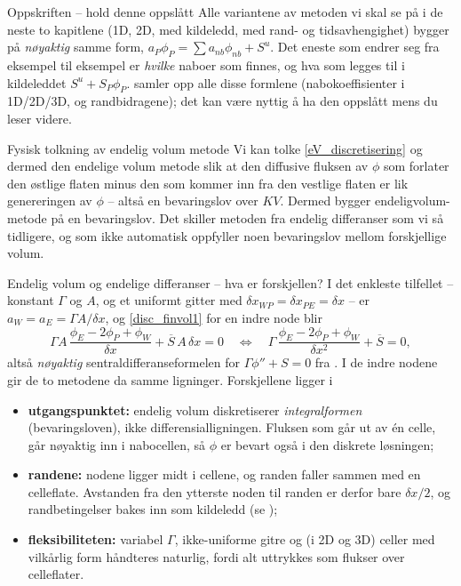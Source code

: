 \begin{rem}{Oppskriften -- hold denne oppslått}
Alle variantene av metoden vi skal se på i de neste to kapitlene (1D, 2D, med kildeledd, med rand- og tidsavhengighet) bygger på \emph{nøyaktig} samme form, $a_P\phi_P=\sum a_{nb}\phi_{nb}+S^u$. Det eneste som endrer seg fra eksempel til eksempel er \emph{hvilke} naboer som finnes, og hva som legges til i kildeleddet $S^u+S_P\phi_P$.  samler opp alle disse formlene (nabokoeffisienter i 1D/2D/3D, og randbidragene); det kan være nyttig å ha den oppslått mens du leser videre.
\end{rem}

\begin{oppsum}{Fysisk tolkning av endelig volum metode}
Vi kan tolke \eqref{eV_discretisering} og dermed den endelige volum metode slik at den diffusive fluksen av $\phi$ som forlater den østlige flaten minus den som kommer inn fra den vestlige flaten er lik genereringen av $\phi$ – altså en bevaringslov over $KV$.
Dermed bygger endeligvolum-metode på en bevaringslov. Det skiller metoden fra endelig differanser som vi så tidligere, og som ikke automatisk oppfyller noen bevaringslov mellom forskjellige volum.
\end{oppsum}

\begin{rem}{Endelig volum og endelige differanser -- hva er forskjellen?}\label{rem:EVM_FD}
I det enkleste tilfellet -- konstant $\Gamma$ og $A$, og et uniformt gitter med $\delta x_{WP}=\delta x_{PE}=\delta x$ -- er $a_W=a_E=\Gamma A/\delta x$, og \eqref{disc_finvol1} for en indre node blir
\[
\Gamma A\,\frac{\phi_E-2\phi_P+\phi_W}{\delta x} + \overline{S}\,A\,\delta x = 0
\quad\Longleftrightarrow\quad
\Gamma\,\frac{\phi_E-2\phi_P+\phi_W}{\delta x^2} + \overline{S} = 0,
\]
altså \emph{nøyaktig} sentraldifferanseformelen for $\Gamma\phi''+S=0$ fra . I de indre nodene gir de to metodene da samme ligninger. Forskjellene ligger i
\begin{itemize}
\item \textbf{utgangspunktet:} endelig volum diskretiserer \emph{integralformen} (bevaringsloven), ikke differensialligningen. Fluksen som går ut av én celle, går nøyaktig inn i nabocellen, så $\phi$ er bevart også i den diskrete løsningen;
\item \textbf{randene:} nodene ligger midt i cellene, og randen faller sammen med en celleflate. Avstanden fra den ytterste noden til randen er derfor bare $\delta x/2$, og randbetingelser bakes inn som kildeledd (se );
\item \textbf{fleksibiliteten:} variabel $\Gamma$, ikke-uniforme gitre og (i 2D og 3D) celler med vilkårlig form håndteres naturlig, fordi alt uttrykkes som flukser over celleflater.
\end{itemize}
\end{rem}
